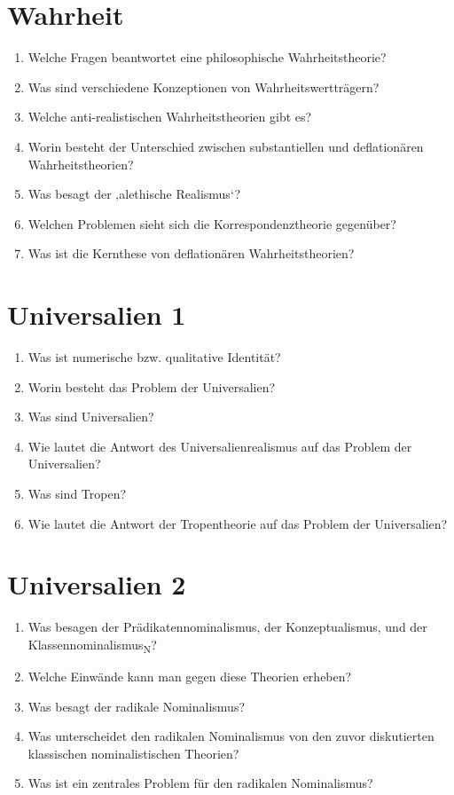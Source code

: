 \documentclass[../main.tex]{subfiles}
\begin{document}
\section{Wahrheit} 
\begin{enumerate}
	\item Welche Fragen beantwortet eine philosophische Wahrheitstheorie?
	\item Was sind verschiedene Konzeptionen von Wahrheitswertträgern?
	\item Welche anti-realistischen Wahrheitstheorien gibt es?
	\item Worin besteht der Unterschied zwischen substantiellen und deflationären Wahrheitstheorien?
	\item Was besagt der ‚alethische Realismus‘?
	\item Welchen Problemen sieht sich die Korrespondenztheorie gegenüber?
	\item Was ist die Kernthese von deflationären Wahrheitstheorien?
\end{enumerate}

\section{Universalien 1} 
\begin{enumerate}
	\item Was ist numerische bzw. qualitative Identität?
	\item Worin besteht das Problem der Universalien?
	\item Was sind Universalien?
	\item Wie lautet die Antwort des Universalienrealismus auf das Problem der Universalien?
	\item Was sind Tropen?
	\item Wie lautet die Antwort der Tropentheorie auf das Problem der Universalien?
\end{enumerate}

\section{Universalien 2} 
\begin{enumerate}
	\item Was besagen der Prädikatennominalismus, der Konzeptualismus, und der Klassennominalismus\textsubscript{N}?
	\item Welche Einwände kann man gegen diese Theorien erheben?
	\item Was besagt der radikale Nominalismus?
	\item Was unterscheidet den radikalen Nominalismus von den zuvor diskutierten klassischen nominalistischen Theorien?
	\item Was ist ein zentrales Problem für den radikalen Nominalismus?
\end{enumerate}
\end{document}
